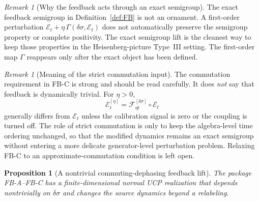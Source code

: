 \documentclass[12pt]{article}
\newtheorem{proposition}[theorem]{Proposition}
\theoremstyle{definition}
\theoremstyle{remark}
\newtheorem{remark}[theorem]{Remark}
\begin{document}
\begin{remark}[Why the feedback acts through an exact semigroup]
The exact feedback semigroup in Definition~\ref{def:FB} is not an
ornament. A first-order perturbation
\(\mathcal E_t+\eta\,\Gamma(\delta\sigma,\mathcal E_t)\) does not
automatically preserve the semigroup property or complete positivity.
The exact semigroup lift is the cleanest way to keep those properties in
the Heisenberg-picture Type~III setting. The first-order map
\(\Gamma\) reappears only after the exact object has been defined.
\end{remark}

\begin{remark}[Meaning of the strict commutation input]
The commutation requirement in FB-C is strong and should be read
carefully. It does \emph{not} say that feedback is dynamically trivial.
For \(\eta>0\),
\[
\mathcal E_t^{[\eta]}
=
\mathscr F_{\eta t}^{[\delta\sigma]}\circ \mathcal E_t
\]
generally differs from \(\mathcal E_t\) unless the calibration signal is
zero or the coupling is turned off. The role of strict commutation is
only to keep the algebra-level time ordering unchanged, so that the
modified dynamics remains an exact semigroup without entering a more
delicate generator-level perturbation problem. Relaxing FB-C to an
approximate-commutation condition is left open.
\end{remark}

\begin{proposition}[A nontrivial commuting-dephasing feedback lift]
\label{prop:fdlift}
The package FB-A--FB-C has a finite-dimensional normal UCP realization
that depends nontrivially on \(\delta\sigma\) and changes the source
dynamics beyond a relabeling.
\end{proposition}
\end{document}
